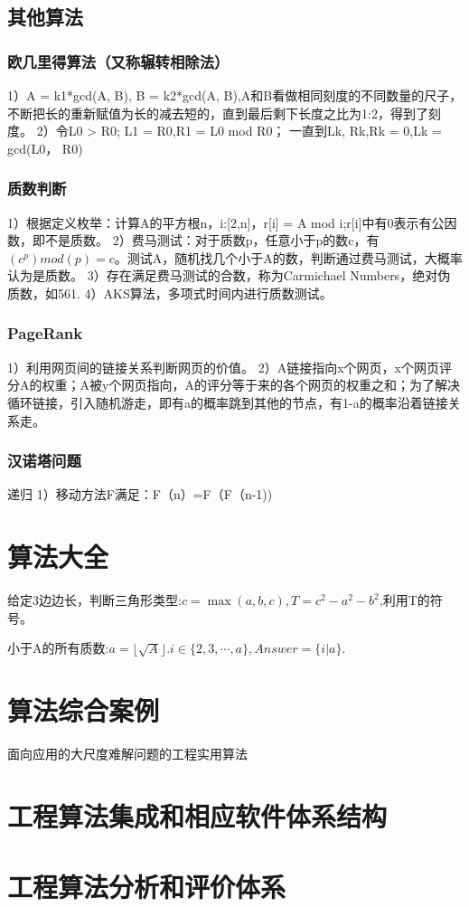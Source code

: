 \documentclass[UTF8]{../computerUniverse}
\begin{document}
\section{其他算法}

\subsection{欧几里得算法（又称辗转相除法）}
1）A = k1*gcd(A, B), B = k2*gcd(A, B),A和B看做相同刻度的不同数量的尺子，不断把长的重新赋值为长的减去短的，直到最后剩下长度之比为1:2，得到了刻度。
2）令L0 > R0;
L1 = R0,R1 = L0 mod R0；
一直到Lk, Rk,Rk = 0,Lk = gcd(L0， R0)


\subsection{质数判断}
1）根据定义枚举：计算A的平方根n，i:[2,n]，r[i] = A mod i;r[i]中有0表示有公因数，即不是质数。
2）费马测试：对于质数p，任意小于p的数c，有$(c^p)mod(p) = c$。测试A，随机找几个小于A的数，判断通过费马测试，大概率认为是质数。
3）存在满足费马测试的合数，称为Carmichael Numbers，绝对伪质数，如561.
4）AKS算法，多项式时间内进行质数测试。


\subsection{PageRank}
1）利用网页间的链接关系判断网页的价值。
2）A链接指向x个网页，x个网页评分A的权重；A被y个网页指向，A的评分等于来的各个网页的权重之和；为了解决循环链接，引入随机游走，即有a的概率跳到其他的节点，有1-a的概率沿着链接关系走。


\subsection{汉诺塔问题}
递归
1）移动方法F满足：F（n）=F（F（n-1))


\chapter{算法大全}


\begin{proposition}
  给定3边边长，判断三角形类型:$c = \max(a,b,c), T = c^2 -a^2-b^2$,利用T的符号。
\end{proposition}


\begin{proposition}
  小于A的所有质数:$a = \lfloor \sqrt{A}\rfloor. i\in \{2,3,\cdots, a\}, Answer  =\{i|a\} $.
\end{proposition}


\chapter{算法综合案例}
面向应用的大尺度难解问题的工程实用算法





\chapter{工程算法集成和相应软件体系结构}

\chapter{工程算法分析和评价体系}
\end{document}
